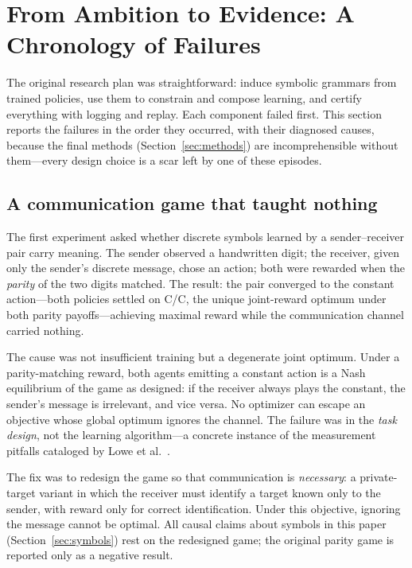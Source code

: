 \documentclass[11pt]{article}
\begin{document}
\section{From Ambition to Evidence: A Chronology of Failures}

The original research plan was straightforward: induce symbolic grammars from trained policies, use them to constrain and compose learning, and certify everything with logging and replay. Each component failed first. This section reports the failures in the order they occurred, with their diagnosed causes, because the final methods (Section~\ref{sec:methods}) are incomprehensible without them---every design choice is a scar left by one of these episodes.

\subsection{A communication game that taught nothing}

The first experiment asked whether discrete symbols learned by a sender--receiver pair carry meaning. The sender observed a handwritten digit; the receiver, given only the sender's discrete message, chose an action; both were rewarded when the \textit{parity} of the two digits matched. The result: the pair converged to the constant action---both policies settled on C/C, the unique joint-reward optimum under both parity payoffs---achieving maximal reward while the communication channel carried nothing.

The cause was not insufficient training but a degenerate joint optimum. Under a parity-matching reward, both agents emitting a constant action is a Nash equilibrium of the game as designed: if the receiver always plays the constant, the sender's message is irrelevant, and vice versa. No optimizer can escape an objective whose global optimum ignores the channel. The failure was in the \textit{task design}, not the learning algorithm---a concrete instance of the measurement pitfalls cataloged by Lowe et al.\ \cite{lowe2019}.

The fix was to redesign the game so that communication is \textit{necessary}: a private-target variant in which the receiver must identify a target known only to the sender, with reward only for correct identification. Under this objective, ignoring the message cannot be optimal. All causal claims about symbols in this paper (Section~\ref{sec:symbols}) rest on the redesigned game; the original parity game is reported only as a negative result.
\end{document}
